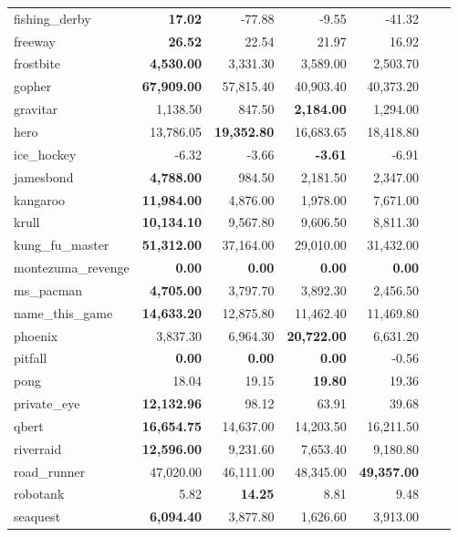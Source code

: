 \begin{table}[h!t]
\begin{tabular}{l|rrrrr|r}
        fishing\_derby & \textbf{17.02} & -77.88 & -9.55 & -41.32 \\ 
        freeway & \textbf{26.52} & 22.54 & 21.97 & 16.92 \\ 
        frostbite & \textbf{4,530.00} & 3,331.30 & 3,589.00 & 2,503.70 \\ 
        gopher & \textbf{67,909.00} & 57,815.40 & 40,903.40 & 40,373.20 \\ 
        gravitar & 1,138.50 & 847.50 & \textbf{2,184.00} & 1,294.00 \\ 
        hero& 13,786.05 & \textbf{19,352.80} & 16,683.65 & 18,418.80 \\ 
        ice\_hockey & -6.32 & -3.66 & \textbf{-3.61} & -6.91 \\ 
        jamesbond & \textbf{4,788.00} & 984.50 & 2,181.50 & 2,347.00 \\ 
        kangaroo & \textbf{11,984.00} & 4,876.00 & 1,978.00 & 7,671.00 \\ 
        krull & \textbf{10,134.10} & 9,567.80 & 9,606.50 & 8,811.30 \\ 
        kung\_fu\_master & \textbf{51,312.00} & 37,164.00 & 29,010.00 & 31,432.00 \\ 
        montezuma\_revenge & \textbf{0.00} & \textbf{0.00} & \textbf{0.00} & \textbf{0.00} \\ 
        ms\_pacman & \textbf{4,705.00} & 3,797.70 & 3,892.30 & 2,456.50 \\ 
        name\_this\_game & \textbf{14,633.20} & 12,875.80 & 11,462.40 & 11,469.80 \\ 
        phoenix & 3,837.30 & 6,964.30 & \textbf{20,722.00} & 6,631.20 \\ 
        pitfall & \textbf{0.00} & \textbf{0.00} & \textbf{0.00} & -0.56 \\ 
        pong & 18.04 & 19.15 & \textbf{19.80} & 19.36 \\ 
        private\_eye & \textbf{12,132.96} & 98.12 & 63.91 & 39.68 \\ 
        qbert & \textbf{16,654.75} & 14,637.00 & 14,203.50 & 16,211.50 \\ 
        riverraid & \textbf{12,596.00} & 9,231.60 & 7,653.40 & 9,180.80 \\ 
        road\_runner & 47,020.00 & 46,111.00 & 48,345.00 & \textbf{49,357.00} \\ 
        robotank & 5.82 & \textbf{14.25} & 8.81 & 9.48 \\ 
        seaquest & \textbf{6,094.40} & 3,877.80 & 1,626.60 & 3,913.00 \\ 

\end{tabular}
\end{table}

